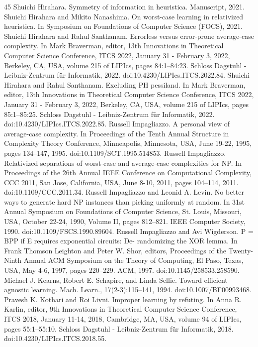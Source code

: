 \begin{thebibliography}{45}
 Shuichi Hirahara. Symmetry of information in heuristica. Manuscript, 2021.
 Shuichi Hirahara and Mikito Nanashima. On worst-case learning in relativized heuristica. In Symposium on Foundations of Computer Science (FOCS), 2021.
 Shuichi Hirahara and Rahul Santhanam. Errorless versus error-prone average-case complexity. In Mark Braverman, editor, 13th Innovations in Theoretical Computer Science Conference, ITCS 2022, January 31 - February 3, 2022, Berkeley, CA, USA, volume 215 of LIPIcs, pages 84:1–84:23. Schloss Dagstuhl - Leibniz-Zentrum für Informatik, 2022. doi:10.4230/LIPIcs.ITCS.2022.84.
 Shuichi Hirahara and Rahul Santhanam. Excluding PH pessiland. In Mark Braverman, editor, 13th Innovations in Theoretical Computer Science Conference, ITCS 2022, January 31 - February 3, 2022, Berkeley, CA, USA, volume 215 of LIPIcs, pages 85:1–85:25. Schloss Dagstuhl - Leibniz-Zentrum für Informatik, 2022. doi:10.4230/LIPIcs.ITCS.2022.85.
 Russell Impagliazzo. A personal view of average-case complexity. In Proceedings of the Tenth Annual Structure in Complexity Theory Conference, Minneapolis, Minnesota, USA, June 19-22, 1995, pages 134–147, 1995. doi:10.1109/SCT.1995.514853.
 Russell Impagliazzo. Relativized separations of worst-case and average-case complexities for NP. In Proceedings of the 26th Annual IEEE Conference on Computational Complexity, CCC 2011, San Jose, California, USA, June 8-10, 2011, pages 104–114, 2011. doi:10.1109/CCC.2011.34.
 Russell Impagliazzo and Leonid A. Levin. No better ways to generate hard NP instances than picking uniformly at random. In 31st Annual Symposium on Foundations of Computer Science, St. Louis, Missouri, USA, October 22-24, 1990, Volume II, pages 812–821. IEEE Computer Society, 1990. doi:10.1109/FSCS.1990.89604.
 Russell Impagliazzo and Avi Wigderson. P = BPP if E requires exponential circuits: De- randomizing the XOR lemma. In Frank Thomson Leighton and Peter W. Shor, editors, Proceedings of the Twenty-Ninth Annual ACM Symposium on the Theory of Computing, El Paso, Texas, USA, May 4-6, 1997, pages 220–229. ACM, 1997. doi:10.1145/258533.258590.
 Michael J. Kearns, Robert E. Schapire, and Linda Sellie. Toward efficient agnostic learning. Mach. Learn., 17(2-3):115–141, 1994. doi:10.1007/BF00993468.
 Pravesh K. Kothari and Roi Livni. Improper learning by refuting. In Anna R. Karlin, editor, 9th Innovations in Theoretical Computer Science Conference, ITCS 2018, January 11-14, 2018, Cambridge, MA, USA, volume 94 of LIPIcs, pages 55:1–55:10. Schloss Dagstuhl - Leibniz-Zentrum für Informatik, 2018. doi:10.4230/LIPIcs.ITCS.2018.55.

\end{thebibliography}
